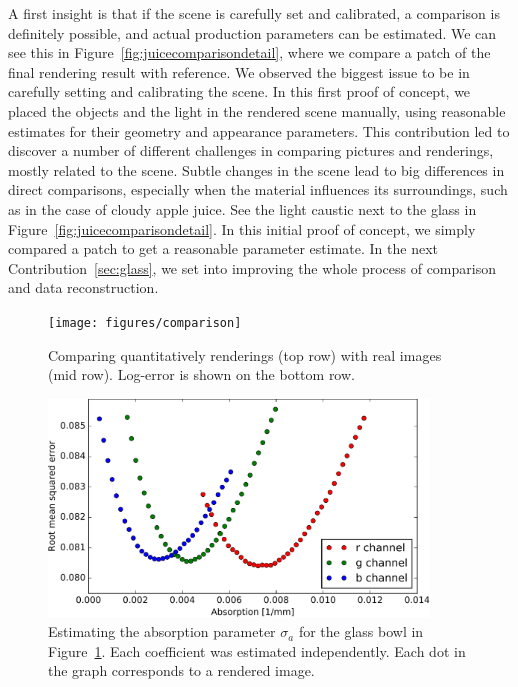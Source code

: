 A first insight is that if the scene is carefully set and calibrated, a comparison is definitely possible, and actual production parameters can be estimated. We can see this in Figure~\ref{fig:juicecomparisondetail}, where we compare a patch of the final rendering result with reference. We observed the biggest issue to be in carefully setting and calibrating the scene. In this first proof of concept, we placed the objects and the light in the rendered scene manually, using reasonable estimates for their geometry and appearance parameters. This contribution led to discover a number of different challenges in comparing pictures and renderings, mostly related to the scene. Subtle changes in the scene lead to big differences in direct comparisons, especially when the material influences its surroundings, such as in the case of cloudy apple juice. See the light caustic next to the glass in Figure~\ref{fig:juicecomparisondetail}. In this initial proof of concept, we simply compared a patch to get a reasonable parameter estimate. In the next Contribution~\ref{sec:glass}, we set into improving the whole process of comparison and data reconstruction.

\begin{figure}
\centering
 \texttt{[image: figures/comparison]} 
\caption{Comparing quantitatively renderings (top row) with real images (mid row). Log-error is shown on the bottom row.}
\label{fig:glasscomparison}
\end{figure}

\begin{figure}
\centering
\includegraphics[width=0.9\textwidth]{figures/glass_bowl_analysis_by_synthesis}  \caption{Estimating the absorption parameter $\sigma_a$ for the glass bowl in Figure~\ref{fig:glasscomparison}. Each coefficient was estimated independently. Each dot in the graph corresponds to a rendered image. }
\label{fig:glasscomparisongraph}
\end{figure}

